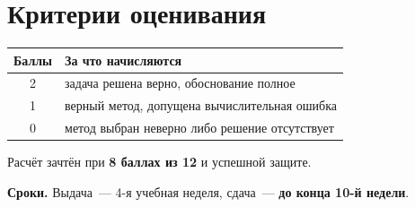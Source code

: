 \documentclass[12pt, a4paper]{article}
\begin{document}
\section*{Критерии оценивания}

\begin{center}
\begin{tabular}{|c|l|}
  \hline
  Баллы & За что начисляются \\
  \hline
  2 & задача решена верно, обоснование полное \\
  1 & верный метод, допущена вычислительная ошибка \\
  0 & метод выбран неверно либо решение отсутствует \\
  \hline
\end{tabular}
\end{center}

\vspace{0.5em}
\noindent
Расчёт зачтён при \textbf{8 баллах из 12} и успешной защите.

\vspace{0.7em}
\noindent\textbf{Сроки.} Выдача~--- 4-я учебная неделя,
сдача~--- \textbf{до конца 10-й недели}.
\end{document}
